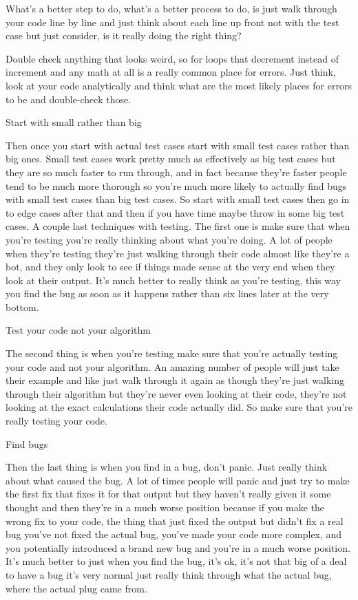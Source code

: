 What's a better step to do, what's a better process to do, is just walk through your code line by line and just think about each line up front not with the test case but just consider, is it really doing the right thing?

Double check anything that looks weird, so for loops that decrement instead of increment and any math at all is a really common place for errors. Just think, look at your code analytically and think what are the most likely places for errors to be and double-check those.

Start with small rather than big

Then once you start with actual test cases start with small test cases rather than big ones. Small test cases work pretty much as effectively as big test cases but they are so much faster to run through, and in fact because they're faster people tend to be much more thorough so you're much more likely to actually find bugs with small test cases than big test cases. So start with small test cases then go in to edge cases after that and then if you have time maybe throw in some big test cases. A couple last techniques with testing. The first one is make sure that when you're testing you're really thinking about what you're doing. A lot of people when they're testing they're just walking through their code almost like they're a bot, and they only look to see if things made sense at the very end when they look at their output. It's much better to really think as you're testing, this way you find the bug as soon as it happens rather than six lines later at the very bottom.

Test your code not your algorithm

The second thing is when you're testing make sure that you're actually testing your code and not your algorithm. An amazing number of people will just take their example and like just walk through it again as though they're just walking through their algorithm but they're never even looking at their code, they're not looking at the exact calculations their code actually did. So make sure that you're really testing your code.

Find bugs

Then the last thing is when you find in a bug, don't panic. Just really think about what caused the bug. A lot of times people will panic and just try to make the first fix that fixes it for that output but they haven't really given it some thought and then they're in a much worse position because if you make the wrong fix to your code, the thing that just fixed the output but didn't fix a real bug you've not fixed the actual bug, you've made your code more complex, and you potentially introduced a brand new bug and you're in a much worse position. It's much better to just when you find the bug, it's ok, it's not that big of a deal to have a bug it's very normal just really think through what the actual bug, where the actual plug came from.

